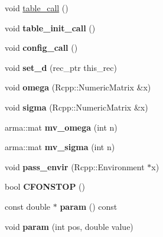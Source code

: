 \begin{DoxyCompactItemize}
\item 
void \hyperlink{classodeproblem_a62371ab3a7331c680da61c34e0a77390}{table\+\_\+call} ()
\item 
\mbox{\label{classodeproblem_a5671e548c6e81afd353a45b4b3c845af}} 
void {\bfseries table\+\_\+init\+\_\+call} ()
\item 
\mbox{\label{classodeproblem_a23ba805e57f18ec631645247c631c0ac}} 
void {\bfseries config\+\_\+call} ()
\item 
\mbox{\label{classodeproblem_a40b09d94a66b474fd65213e415ddc969}} 
void {\bfseries set\+\_\+d} (rec\+\_\+ptr this\+\_\+rec)
\item 
\mbox{\label{classodeproblem_a7d4724eff5756cd90aa4d8d7571b932e}} 
void {\bfseries omega} (Rcpp\+::\+Numeric\+Matrix \&x)
\item 
\mbox{\label{classodeproblem_abb8cdbe6d433204cb209405789b521f8}} 
void {\bfseries sigma} (Rcpp\+::\+Numeric\+Matrix \&x)
\item 
\mbox{\label{classodeproblem_a2827c3ef1ce3acaa967dd6e315debfe3}} 
arma\+::mat {\bfseries mv\+\_\+omega} (int n)
\item 
\mbox{\label{classodeproblem_aa7d69c4024cf6783ce7c2556367a0675}} 
arma\+::mat {\bfseries mv\+\_\+sigma} (int n)
\item 
\mbox{\label{classodeproblem_a6a1253090d65c34a9a26e77b01a82573}} 
void {\bfseries pass\+\_\+envir} (Rcpp\+::\+Environment $\ast$x)
\item 
\mbox{\label{classodeproblem_a962ce2e5ac9d9b6514e6d06c52ece74e}} 
bool {\bfseries C\+F\+O\+N\+S\+T\+OP} ()
\item 
\mbox{\label{classodeproblem_aeedc05b398a0440b9d8f96876e56a8a6}} 
const double $\ast$ {\bfseries param} () const
\item 
\mbox{\label{classodeproblem_a9669835dd93ca8415466b031aaccf0a5}} 
void {\bfseries param} (int pos, double value)

\end{DoxyCompactItemize}
